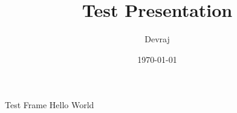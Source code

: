 \documentclass[aspectratio=169, 10pt]{beamer}
\title{Test Presentation}
\author{Devraj}
\date{\today}
\begin{document}
\maketitle
\begin{frame}{Test Frame}
Hello World
\end{frame}
\end{document}
